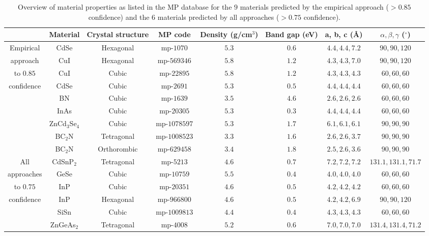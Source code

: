 \documentclass[superscriptaddress,
preprint,
 amsmath,amssymb,
 aps,
]{revtex4-2}
\begin{document}
\begin{table}[t]
    \centering 
    \caption{Overview of material properties as listed in the MP database for the $9$ materials predicted by the empirical approach ($>0.85$ confidence) and the $6$ materials predicted by all approaches ($>0.75$ confidence). %
    }
    \begin{tabular}{c|c c c c c c c }
      & Material & Crystal structure & MP code & Density (g/cm$^3$) & Band gap (\si{\electronvolt}) & a, b, c (\AA) & $\alpha,\beta,\gamma$ ($^\circ$) \\
    \hline 
    Empirical & CdSe & Hexagonal & mp-$1070$ & $5.3$ & $0.6$ & $4.4,4.4,7.2$ & $90,90,120$ \\
    approach  & CuI & Hexagonal & mp-$569346$ & $5.8$ & $1.2$ & $4.3,4.3,7.0$ & $90,90,120$ \\ 
    to $0.85$  & CuI & Cubic & mp-$22895$ & $5.8$ & $1.2$ & $4.3,4.3,4.3$ & $60,60,60$  \\ 
    confidence & CdSe & Cubic & mp-$2691$ & $5.3$ & $0.5$ & $4.4,4.4,4.4$ & $60,60,60$  \\
     & BN & Cubic & mp-$1639$ & $3.5$ & $4.6$ & $2.6,2.6,2.6$ & $60,60,60$  \\
     & InAs & Cubic & mp-$20305$ & $5.3$ & $0.3$ & $4.4,4.4,4.4$ & $60,60,60$ \\
     & ZnCd$_3$Se$_4$ & Cubic & mp-$1078597$ & $5.3$ & $1.7$ & $6.1,6.1,6.1$ & $90,90,90$ \\
     & BC$_2$N & Tetragonal & mp-$1008523$ & $3.3$ & $1.6$ & $2.6,2.6,3.7$ & $90,90,90$ \\
     & BC$_2$N & Orthorombic & mp-$629458$ & $3.4$ & $1.8$ & $2.5,2.6,3.6$ & $90,90,90$ \\
    \hline 
    All & CdSnP$_2$ & Tetragonal & mp-$5213$ & $4.6$ & $0.7$ & $7.2,7.2,7.2$ & $131.1,131.1,71.7$ \\
    approaches & GeSe & Cubic & mp-$10759$ & $5.5$ & $0.4$ & $4.0,4.0,4.0$ & $60,60,60$ \\
    to $0.75$  & InP & Cubic & mp-$20351$ & $4.6$ & $0.5$ & $4.2,4.2,4.2$ &  $60,60,60$\\ 
    confidence & InP & Hexagonal & mp-$966800$ & $4.6$ & $0.5$ & $4.2,4.2,6.9$ & $90,90,120$ \\ 
     & SiSn & Cubic & mp-$1009813$ & $4.4$ & $0.4$ & $4.3,4.3,4.3$ & $60,60,60$ \\
     & ZnGeAs$_2$ & Tetragonal & mp-$4008$ & $5.2$ & $0.6$ & $7.0,7.0,7.0$ & $131.4,131.4,71.2$ \\
    \end{tabular}
    \label{tab:materialproperties}
\end{table}
\end{document}
